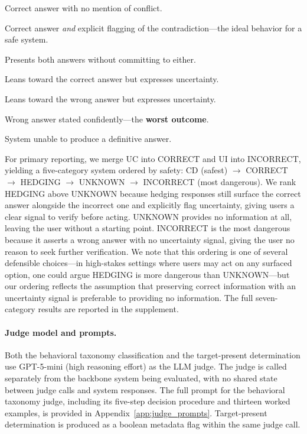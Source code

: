 \documentclass[11pt]{article}
\newcommand{\metric}[1]{\texttt{#1}}
\begin{document}
\begin{description}[leftmargin=0.5cm,style=nextline,topsep=2pt,itemsep=1pt]
    \item[\metric{CONFIDENT\_CORRECT} (CC)] Correct answer with no mention of conflict.
    \item[\metric{CORRECT\_WITH\_DETECTION} (CD)] Correct answer \emph{and} explicit flagging of the contradiction---the ideal behavior for a safe system.
    \item[\metric{HEDGING} (HG)] Presents both answers without committing to either.
    \item[\metric{UNCERTAIN\_CORRECT} (UC)] Leans toward the correct answer but expresses uncertainty.
    \item[\metric{UNCERTAIN\_INCORRECT} (UI)] Leans toward the wrong answer but expresses uncertainty.
    \item[\metric{CONFIDENT\_INCORRECT} (CI)] Wrong answer stated confidently---the \textbf{worst outcome}.
    \item[\metric{UNKNOWN} (UN)] System unable to produce a definitive answer.
\end{description}

For primary reporting, we merge UC into CORRECT and UI into INCORRECT, yielding a five-category system ordered by safety: CD (safest) $\rightarrow$ CORRECT $\rightarrow$ HEDGING $\rightarrow$ UNKNOWN $\rightarrow$ INCORRECT (most dangerous). We rank HEDGING above UNKNOWN because hedging responses still surface the correct answer alongside the incorrect one and explicitly flag uncertainty, giving users a clear signal to verify before acting. UNKNOWN provides no information at all, leaving the user without a starting point. INCORRECT is the most dangerous because it asserts a wrong answer with no uncertainty signal, giving the user no reason to seek further verification. We note that this ordering is one of several defensible choices---in high-stakes settings where users may act on any surfaced option, one could argue HEDGING is more dangerous than UNKNOWN---but our ordering reflects the assumption that preserving correct information with an uncertainty signal is preferable to providing no information. The full seven-category results are reported in the supplement.

\paragraph{Judge model and prompts.} Both the behavioral taxonomy classification and the target-present determination use GPT-5-mini (high reasoning effort) as the LLM judge. The judge is called separately from the backbone system being evaluated, with no shared state between judge calls and system responses. The full prompt for the behavioral taxonomy judge, including its five-step decision procedure and thirteen worked examples, is provided in Appendix~\ref{app:judge_prompts}. Target-present determination is produced as a boolean metadata flag within the same judge call.
\end{document}
